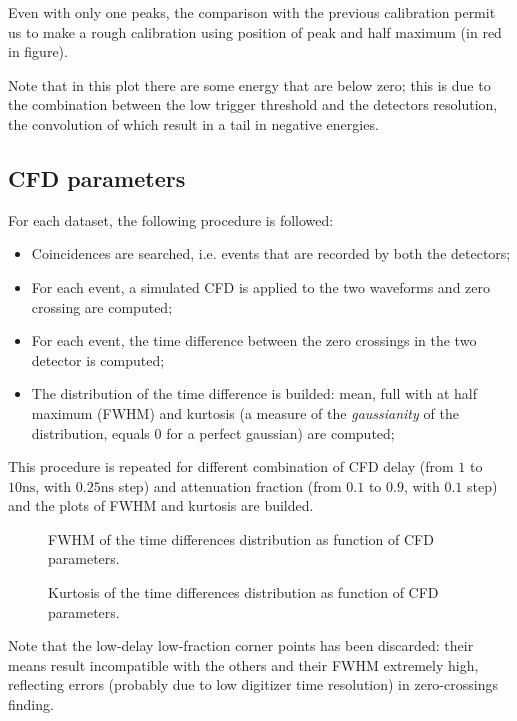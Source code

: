 \documentclass[11pt,a4 paper]{article}
\begin{document}
Even with only one peaks, the comparison with the previous calibration permit us to make a rough calibration using position of peak and half maximum (in red in figure).

Note that in this plot there are some energy that are below zero; this is due to the combination between the low trigger threshold and the detectors resolution, the convolution of which result in a tail in negative energies.

\subsection{CFD parameters}
For each dataset, the following procedure is followed:
\begin{itemize}[noitemsep]
    \item Coincidences are searched, i.e. events that are recorded by both the detectors;
    \item For each event, a simulated CFD is applied to the two waveforms and zero crossing are computed;
    \item For each event, the time difference between the zero crossings in the two detector is computed;
    \item The distribution of the time difference is builded: mean, full with at half maximum (FWHM) and kurtosis (a measure of the \emph{gaussianity} of the distribution, equals $0$ for a perfect gaussian) are computed;
\end{itemize}
This procedure is repeated for different combination of CFD delay (from $1$ to $10\si{\nano\second}$, with $0.25\si{\nano\second}$ step) and attenuation fraction (from $0.1$ to $0.9$, with $0.1$ step) and the plots of FWHM and kurtosis are builded. 

\begin{figure}[H]
    \centering
    \caption{FWHM of the time differences distribution as function of CFD parameters.}
    \label{fig:FWHM:sim}
\end{figure}

\begin{figure}[H]
    \centering
    \caption{Kurtosis of the time differences distribution as function of CFD parameters.}
    \label{fig:FWHM:sim}
\end{figure}

Note that the low-delay low-fraction corner points has been discarded: their means result incompatible with the others and their FWHM extremely high, reflecting errors (probably due to low digitizer time resolution) in zero-crossings finding.
\end{document}
